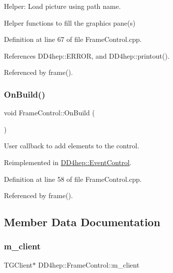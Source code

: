 Helper\+: Load picture using path name. 

Helper functions to fill the graphics pane(s) 

Definition at line 67 of file Frame\+Control.\+cpp.



References D\+D4hep\+::\+E\+R\+R\+OR, and D\+D4hep\+::printout().



Referenced by frame().

\hypertarget{class_d_d4hep_1_1_frame_control_a934ef76420162167364133e43c7be8b5}{}\label{class_d_d4hep_1_1_frame_control_a934ef76420162167364133e43c7be8b5} 
\subsubsection{\texorpdfstring{On\+Build()}{OnBuild()}}
{\footnotesize\ttfamily void Frame\+Control\+::\+On\+Build (\begin{DoxyParamCaption}{ }\end{DoxyParamCaption})\hspace{0.3cm}{\ttfamily [virtual]}}



User callback to add elements to the control. 



Reimplemented in \hyperlink{class_d_d4hep_1_1_event_control_ada9bb8f5e290f6acb6832208f407a53a}{D\+D4hep\+::\+Event\+Control}.



Definition at line 58 of file Frame\+Control.\+cpp.



Referenced by frame().



\subsection{Member Data Documentation}
\hypertarget{class_d_d4hep_1_1_frame_control_aaca4e5ed19a1982777f7d19bb7dd6a6b}{}\label{class_d_d4hep_1_1_frame_control_aaca4e5ed19a1982777f7d19bb7dd6a6b} 
\subsubsection{\texorpdfstring{m\+\_\+client}{m\_client}}
{\footnotesize\ttfamily T\+G\+Client$\ast$ D\+D4hep\+::\+Frame\+Control\+::m\+\_\+client\hspace{0.3cm}{\ttfamily [protected]}}



